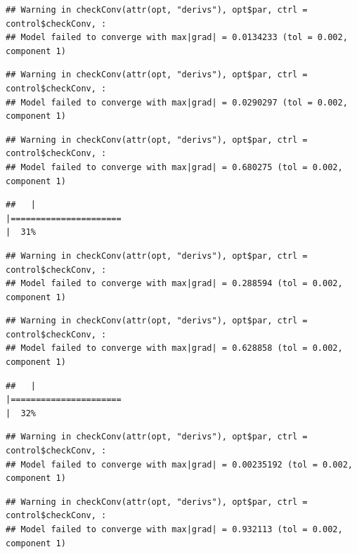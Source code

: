 \documentclass[
  12pt,
]{book}
\begin{document}
\begin{verbatim}
## Warning in checkConv(attr(opt, "derivs"), opt$par, ctrl = control$checkConv, :
## Model failed to converge with max|grad| = 0.0134233 (tol = 0.002, component 1)
\end{verbatim}

\begin{verbatim}
## Warning in checkConv(attr(opt, "derivs"), opt$par, ctrl = control$checkConv, :
## Model failed to converge with max|grad| = 0.0290297 (tol = 0.002, component 1)
\end{verbatim}

\begin{verbatim}
## Warning in checkConv(attr(opt, "derivs"), opt$par, ctrl = control$checkConv, :
## Model failed to converge with max|grad| = 0.680275 (tol = 0.002, component 1)
\end{verbatim}

\begin{verbatim}
##   |                                                                              |======================                                                |  31%
\end{verbatim}

\begin{verbatim}
## Warning in checkConv(attr(opt, "derivs"), opt$par, ctrl = control$checkConv, :
## Model failed to converge with max|grad| = 0.288594 (tol = 0.002, component 1)
\end{verbatim}

\begin{verbatim}
## Warning in checkConv(attr(opt, "derivs"), opt$par, ctrl = control$checkConv, :
## Model failed to converge with max|grad| = 0.628858 (tol = 0.002, component 1)
\end{verbatim}

\begin{verbatim}
##   |                                                                              |======================                                                |  32%
\end{verbatim}

\begin{verbatim}
## Warning in checkConv(attr(opt, "derivs"), opt$par, ctrl = control$checkConv, :
## Model failed to converge with max|grad| = 0.00235192 (tol = 0.002, component 1)
\end{verbatim}

\begin{verbatim}
## Warning in checkConv(attr(opt, "derivs"), opt$par, ctrl = control$checkConv, :
## Model failed to converge with max|grad| = 0.932113 (tol = 0.002, component 1)
\end{verbatim}
\end{document}
